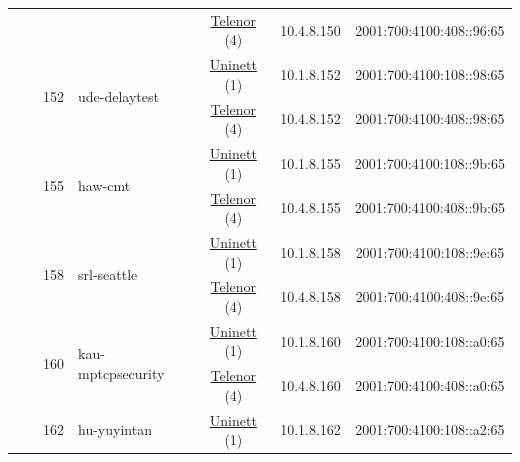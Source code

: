 \begin{small}
\begin{center}
\begin{longtable}{|c|c|c|c|c|c|c|c|}
  &  &  &  & \multicolumn{2}{|c|}{\tiny{\href{https://www.telenor.no}{Telenor} (4)}} & \tiny{10.4.8.150} & \tiny{2001:700:4100:408::96:65} \\* \cline{3-3}\cline{4-4}\cline{5-5}\cline{6-6}\cline{7-7}\cline{8-8}
  &  & \multirow{2}{*}{\tiny{152}} & \multicolumn{1}{|l|}{\multirow{2}{*}{\tiny{ude-delaytest}}} & \multicolumn{2}{|c|}{\tiny{\href{https://www.uninett.no}{Uninett} (1)}} & \tiny{10.1.8.152} & \tiny{2001:700:4100:108::98:65} \\* \cline{5-5}\cline{6-6}\cline{7-7}\cline{8-8}
  &  &  &  & \multicolumn{2}{|c|}{\tiny{\href{https://www.telenor.no}{Telenor} (4)}} & \tiny{10.4.8.152} & \tiny{2001:700:4100:408::98:65} \\* \cline{3-3}\cline{4-4}\cline{5-5}\cline{6-6}\cline{7-7}\cline{8-8}
  &  & \multirow{2}{*}{\tiny{155}} & \multicolumn{1}{|l|}{\multirow{2}{*}{\tiny{haw-cmt}}} & \multicolumn{2}{|c|}{\tiny{\href{https://www.uninett.no}{Uninett} (1)}} & \tiny{10.1.8.155} & \tiny{2001:700:4100:108::9b:65} \\* \cline{5-5}\cline{6-6}\cline{7-7}\cline{8-8}
  &  &  &  & \multicolumn{2}{|c|}{\tiny{\href{https://www.telenor.no}{Telenor} (4)}} & \tiny{10.4.8.155} & \tiny{2001:700:4100:408::9b:65} \\* \cline{3-3}\cline{4-4}\cline{5-5}\cline{6-6}\cline{7-7}\cline{8-8}
  &  & \multirow{2}{*}{\tiny{158}} & \multicolumn{1}{|l|}{\multirow{2}{*}{\tiny{srl-seattle}}} & \multicolumn{2}{|c|}{\tiny{\href{https://www.uninett.no}{Uninett} (1)}} & \tiny{10.1.8.158} & \tiny{2001:700:4100:108::9e:65} \\* \cline{5-5}\cline{6-6}\cline{7-7}\cline{8-8}
  &  &  &  & \multicolumn{2}{|c|}{\tiny{\href{https://www.telenor.no}{Telenor} (4)}} & \tiny{10.4.8.158} & \tiny{2001:700:4100:408::9e:65} \\* \cline{3-3}\cline{4-4}\cline{5-5}\cline{6-6}\cline{7-7}\cline{8-8}
  &  & \multirow{2}{*}{\tiny{160}} & \multicolumn{1}{|l|}{\multirow{2}{*}{\tiny{kau-mptcpsecurity}}} & \multicolumn{2}{|c|}{\tiny{\href{https://www.uninett.no}{Uninett} (1)}} & \tiny{10.1.8.160} & \tiny{2001:700:4100:108::a0:65} \\* \cline{5-5}\cline{6-6}\cline{7-7}\cline{8-8}
  &  &  &  & \multicolumn{2}{|c|}{\tiny{\href{https://www.telenor.no}{Telenor} (4)}} & \tiny{10.4.8.160} & \tiny{2001:700:4100:408::a0:65} \\* \cline{3-3}\cline{4-4}\cline{5-5}\cline{6-6}\cline{7-7}\cline{8-8}
  &  & \multirow{2}{*}{\tiny{162}} & \multicolumn{1}{|l|}{\multirow{2}{*}{\tiny{hu-yuyintan}}} & \multicolumn{2}{|c|}{\tiny{\href{https://www.uninett.no}{Uninett} (1)}} & \tiny{10.1.8.162} & \tiny{2001:700:4100:108::a2:65} \\* \cline{5-5}\cline{6-6}\cline{7-7}\cline{8-8}

\end{longtable}
\end{center}
\end{small}
